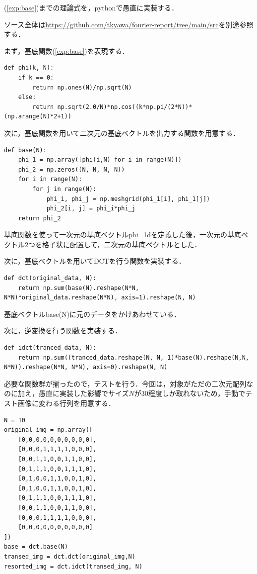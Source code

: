 \documentclass[uplatex,dvipdfmx,ja=standard]{bxjsarticle}
\begin{document}
(\ref{exp:base})までの理論式を，pythonで愚直に実装する．

ソース全体は\url{https://github.com/tkyawa/fourier-report/tree/main/src}を別途参照する．

まず，基底関数(\ref{exp:base})を表現する．

\begin{lstlisting}[caption=dct.phi]
def phi(k, N):
    if k == 0:
        return np.ones(N)/np.sqrt(N)
    else:
        return np.sqrt(2.0/N)*np.cos((k*np.pi/(2*N))*(np.arange(N)*2+1))
\end{lstlisting}

次に，基底関数を用いて二次元の基底ベクトルを出力する関数を用意する．
\newpage

\begin{lstlisting}[caption=dct.base]
def base(N):
    phi_1 = np.array([phi(i,N) for i in range(N)])
    phi_2 = np.zeros((N, N, N, N))
    for i in range(N):
        for j in range(N):
            phi_i, phi_j = np.meshgrid(phi_1[i], phi_1[j])
            phi_2[i, j] = phi_i*phi_j
    return phi_2
\end{lstlisting}


基底関数を使って一次元の基底ベクトルphi\_1dを定義した後，一次元の基底ベクトル2つを格子状に配置して，二次元の基底ベクトルとした．

次に，基底ベクトルを用いてDCTを行う関数を実装する．

\begin{lstlisting}[caption=dct.dct]
def dct(original_data, N):
    return np.sum(base(N).reshape(N*N, N*N)*original_data.reshape(N*N), axis=1).reshape(N, N)
\end{lstlisting}

基底ベクトルbase(N)に元のデータをかけあわせている．

次に，逆変換を行う関数を実装する．

\begin{lstlisting}[caption=dct.idct]
def idct(tranced_data, N):
    return np.sum((tranced_data.reshape(N, N, 1)*base(N).reshape(N,N, N*N)).reshape(N*N, N*N), axis=0).reshape(N, N)
\end{lstlisting}


必要な関数群が揃ったので，テストを行う．今回は，対象がただの二次元配列なのに加え，愚直に実装した影響でサイズ$N$が30程度しか取れないため，手動でテスト画像に変わる行列を用意する．

\begin{lstlisting}[caption=main.py]
N = 10
original_img = np.array([
	[0,0,0,0,0,0,0,0,0,0],
	[0,0,0,1,1,1,1,0,0,0],
	[0,0,1,1,0,0,1,1,0,0],
	[0,1,1,1,0,0,1,1,1,0],
	[0,1,0,0,1,1,0,0,1,0],
	[0,1,0,0,1,1,0,0,1,0],
	[0,1,1,1,0,0,1,1,1,0],
	[0,0,1,1,0,0,1,1,0,0],
	[0,0,0,1,1,1,1,0,0,0],
	[0,0,0,0,0,0,0,0,0,0]
])
base = dct.base(N)
transed_img = dct.dct(original_img,N)
resorted_img = dct.idct(transed_img, N)
\end{lstlisting}
\end{document}
